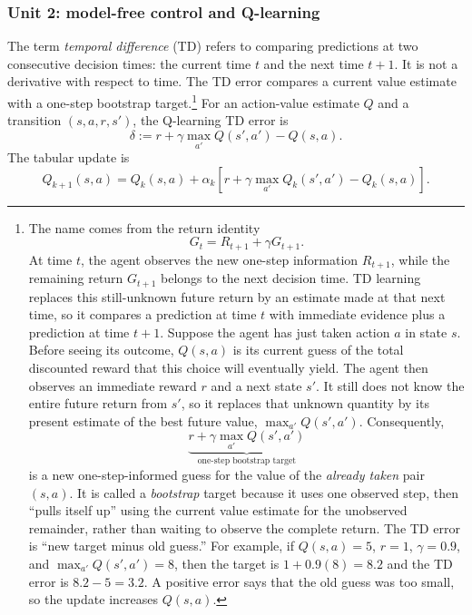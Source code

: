 \documentclass[11pt,a4paper]{article}
\theoremstyle{definition}
\begin{document}
\subsubsection{Unit 2: model-free control and Q-learning}
\label{unit:2}

The term \emph{temporal difference} (TD) refers to comparing predictions at two consecutive
decision times: the current time $t$ and the next time $t+1$. It is not a derivative with
respect to time. The TD error compares a current value estimate with a one-step bootstrap
target.\footnote{The name comes from the return identity
\[
G_t=R_{t+1}+\gamma G_{t+1}.
\]
At time $t$, the agent observes the new one-step information $R_{t+1}$, while the remaining
return $G_{t+1}$ belongs to the next decision time. TD learning replaces this still-unknown
future return by an estimate made at that next time, so it compares a prediction at time $t$
with immediate evidence plus a prediction at time $t+1$. Suppose the agent has just taken
action $a$ in state $s$. Before
seeing its outcome, $Q(s,a)$ is its current guess of the total discounted reward that this
choice will eventually yield. The agent then observes an immediate reward $r$ and a next state
$s'$. It still does not know the entire future return from $s'$, so it replaces that unknown
quantity by its present estimate of the best future value,
$\max_{a'}Q(s',a')$. Consequently,
\[
\underbrace{r+\gamma\max_{a'}Q(s',a')}_{\text{one-step bootstrap target}}
\]
is a new one-step-informed guess for the value of the \emph{already taken} pair $(s,a)$.
It is called a \emph{bootstrap} target because it uses one observed step, then ``pulls itself
up'' using the current value estimate for the unobserved remainder, rather than waiting to
observe the complete return. The TD error is ``new target minus old guess.'' For example, if
$Q(s,a)=5$, $r=1$, $\gamma=0.9$, and
$\max_{a'}Q(s',a')=8$, then the target is $1+0.9(8)=8.2$ and the TD error is
$8.2-5=3.2$. A positive error says that the old guess was too small, so the update increases
$Q(s,a)$.} For an action-value estimate $Q$ and a transition
$(s,a,r,s')$, the Q-learning TD error is
\[
\delta
:=r+\gamma\max_{a'}Q(s',a')-Q(s,a).
\]
The tabular update is
\[
Q_{k+1}(s,a)
=Q_k(s,a)+\alpha_k
\left[r+\gamma\max_{a'}Q_k(s',a')-Q_k(s,a)\right].
\]
\end{document}
